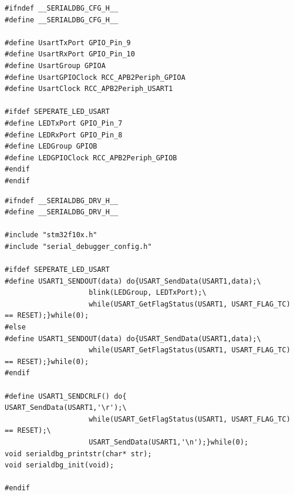\documentclass[a4paper]{ctexart}
\begin{document}
\begin{lstlisting}[caption={File serial\_debugger\_config.h},label={serialdbgch}]
#ifndef __SERIALDBG_CFG_H__
#define __SERIALDBG_CFG_H__

#define UsartTxPort GPIO_Pin_9
#define UsartRxPort GPIO_Pin_10
#define UsartGroup GPIOA
#define UsartGPIOClock RCC_APB2Periph_GPIOA
#define UsartClock RCC_APB2Periph_USART1

#ifdef SEPERATE_LED_USART
#define LEDTxPort GPIO_Pin_7
#define LEDRxPort GPIO_Pin_8
#define LEDGroup GPIOB
#define LEDGPIOClock RCC_APB2Periph_GPIOB
#endif
#endif
\end{lstlisting}

\begin{lstlisting}[caption={File serial\_debugger.h},label={serialdbgdh}]
#ifndef __SERIALDBG_DRV_H__
#define __SERIALDBG_DRV_H__

#include "stm32f10x.h"
#include "serial_debugger_config.h"

#ifdef SEPERATE_LED_USART
#define USART1_SENDOUT(data) do{USART_SendData(USART1,data);\
					blink(LEDGroup, LEDTxPort);\
					while(USART_GetFlagStatus(USART1, USART_FLAG_TC) == RESET);}while(0);
#else
#define USART1_SENDOUT(data) do{USART_SendData(USART1,data);\
					while(USART_GetFlagStatus(USART1, USART_FLAG_TC) == RESET);}while(0);
#endif

#define USART1_SENDCRLF() do{					USART_SendData(USART1,'\r');\
					while(USART_GetFlagStatus(USART1, USART_FLAG_TC) == RESET);\
					USART_SendData(USART1,'\n');}while(0);
void serialdbg_printstr(char* str);
void serialdbg_init(void);

#endif
\end{lstlisting}
\end{document}
